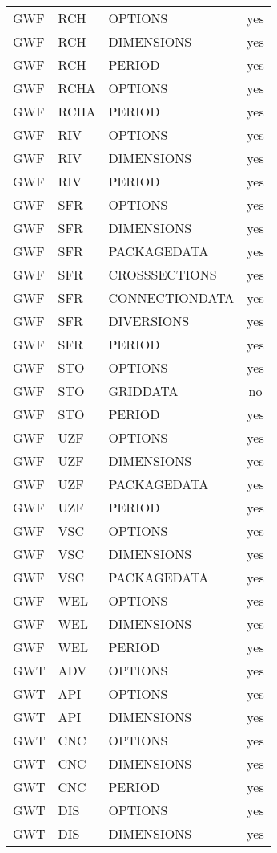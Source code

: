 \begin{longtable}{p{1.5cm} p{1.5cm} p{3cm} c}
\hline
GWF & RCH & OPTIONS & yes \\ 
GWF & RCH & DIMENSIONS & yes \\ 
GWF & RCH & PERIOD & yes \\ 
\hline
GWF & RCHA & OPTIONS & yes \\ 
GWF & RCHA & PERIOD & yes \\ 
\hline
GWF & RIV & OPTIONS & yes \\ 
GWF & RIV & DIMENSIONS & yes \\ 
GWF & RIV & PERIOD & yes \\ 
\hline
GWF & SFR & OPTIONS & yes \\ 
GWF & SFR & DIMENSIONS & yes \\ 
GWF & SFR & PACKAGEDATA & yes \\ 
GWF & SFR & CROSSSECTIONS & yes \\ 
GWF & SFR & CONNECTIONDATA & yes \\ 
GWF & SFR & DIVERSIONS & yes \\ 
GWF & SFR & PERIOD & yes \\ 
\hline
GWF & STO & OPTIONS & yes \\ 
GWF & STO & GRIDDATA & no \\ 
GWF & STO & PERIOD & yes \\ 
\hline
GWF & UZF & OPTIONS & yes \\ 
GWF & UZF & DIMENSIONS & yes \\ 
GWF & UZF & PACKAGEDATA & yes \\ 
GWF & UZF & PERIOD & yes \\ 
\hline
GWF & VSC & OPTIONS & yes \\ 
GWF & VSC & DIMENSIONS & yes \\ 
GWF & VSC & PACKAGEDATA & yes \\ 
\hline
GWF & WEL & OPTIONS & yes \\ 
GWF & WEL & DIMENSIONS & yes \\ 
GWF & WEL & PERIOD & yes \\ 
\hline
GWT & ADV & OPTIONS & yes \\ 
\hline
GWT & API & OPTIONS & yes \\ 
GWT & API & DIMENSIONS & yes \\ 
\hline
GWT & CNC & OPTIONS & yes \\ 
GWT & CNC & DIMENSIONS & yes \\ 
GWT & CNC & PERIOD & yes \\ 
\hline
GWT & DIS & OPTIONS & yes \\ 
GWT & DIS & DIMENSIONS & yes \\ 

\end{longtable}

